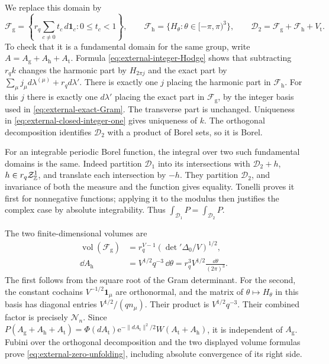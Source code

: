 We replace this domain by
\[
 \mathcal F_{\mathrm g}
 =\left\{r_q\sum_{c\ne0}t_c\,d\mathbf1_c:0\le t_c<1\right\},
 \qquad
 \mathcal F_{\mathrm h}=\{H_\theta:\theta\in[-\pi,\pi)^3\},
 \qquad
 \mathcal D_2=\mathcal F_{\mathrm g}+\mathcal F_{\mathrm h}
                                      +V_{\mathrm t}.
\]
To check that it is a fundamental domain for the same
group, write $A=A_{\mathrm g}+A_{\mathrm h}+A_{\mathrm t}$.
Formula \eqref{eq:external-integer-Hodge} shows that
subtracting $r_qk$ changes the harmonic part by
$H_{2\pi j}$ and the exact part by
$\sum_\mu j_\mu d\lambda^{(\mu)}+r_qd\lambda'$.
There is exactly one $j$ placing the harmonic part
in $\mathcal F_{\mathrm h}$. For this $j$ there is
exactly one $d\lambda'$ placing the exact part
in $\mathcal F_{\mathrm g}$, by the integer basis
used in \eqref{eq:external-exact-Gram}. The transverse
part is unchanged. Uniqueness in
\eqref{eq:external-closed-integer-one} gives uniqueness
of $k$. The orthogonal decomposition identifies
$\mathcal D_2$ with a product of Borel sets, so it
is Borel.

For an integrable periodic Borel function, the integral
over two such fundamental domains is the same.
Indeed partition $\mathcal D_1$ into its intersections
with $\mathcal D_2+h$, $h\in r_q\mathcal Z^1_{\mathbb Z}$,
and translate each intersection by $-h$. They partition
$\mathcal D_2$, and invariance of both the measure and
the function gives equality. Tonelli proves it first
for nonnegative functions; applying it to the modulus
then justifies the complex case by absolute integrability.
Thus $\int_{\mathcal D_1}P=\int_{\mathcal D_2}P$.

The two finite-dimensional volumes are
\begin{align}
 \operatorname{vol}(\mathcal F_{\mathrm g})
    &=r_q^{V-1}(\det{}'\Delta_0/V)^{1/2},
                                     \label{eq:external-gauge-volume}\\
 \dd A_{\mathrm h}
    &=V^{1/2}q^{-3}\,\dd\theta
      =r_q^3V^{1/2}\frac{\dd\theta}{(2\pi)^3}.
                                     \label{eq:external-twist-Jacobian}
\end{align}
The first follows from the square root of the Gram
determinant. For the second, the constant cochains
$V^{-1/2}\mathbf1_\mu$ are orthonormal, and the
matrix of $\theta\mapsto H_\theta$ in this basis
has diagonal entries $V^{1/2}/(qn_\mu)$.
Their product is $V^{1/2}q^{-3}$.
Their combined factor is precisely $\mathcal N_n$.
Since $P(A_{\mathrm g}+A_{\mathrm h}+A_{\mathrm t})
=\Phi(dA_{\mathrm t})\mathrm e^{-\|dA_{\mathrm t}\|^2/2}
W(A_{\mathrm t}+A_{\mathrm h})$, it is independent
of $A_{\mathrm g}$. Fubini over the orthogonal
decomposition and the two displayed volume formulas
prove \eqref{eq:external-zero-unfolding}, including
absolute convergence of its right side.


